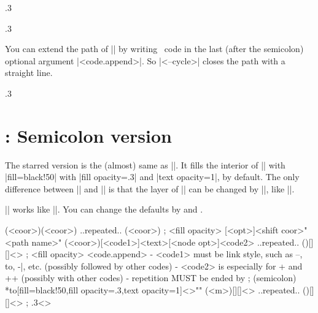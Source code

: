 \begin{tzcode}{.3}
{}
\end{tzcode}

\begin{tzcode}{.3}
{}
\end{tzcode}

You can extend the path of |\tzpath| by writing \Tikz\ code in the last (after the semicolon) optional argument |<code.append>|.
So |<--cycle>| closes the path with a straight line.

\begin{tzcode}{.3}
\end{tzcode}

\section{\protect\cmd{\tzpath*}: Semicolon version}
\label{s:tzpath*}

The starred version \icmd{\tzpath*} is the (almost) same as |\tzlinks*[draw=none]|. It fills the interior of |\tzpath| with |fill=black!50| with |fill opacity=.3| and |text opacity=1|, by default.
The only difference between |\tzpath*| and |\tzlinks*[draw=none]| is that the layer of |\tzpath*| can be changed by |\settzpathlayer|, like ||.

|\tzpath*| works like |\tzpath[fill=black!50,fill opacity=.3,text opacity=1]|.
You can change the defaults by \icmd{\settzfillcolor} and \icmd{\settzfillopacity}.

\begin{tzdef}{}
\tzpath*(<coor>)(<coor>) ..repeated.. (<coor>) ; {<fill opacity>}
[<opt>]<shift coor>"<path name>"
        (<coor>)[<code1>]{<text>}[<node opt>]<code2>
        ..repeated.. ()[]{}[]<> ; {<fill opacity>} <code.append>
  - <code1> must be link style, such as --, to, -|, etc.
           (possibly followed by other codes)
  - <code2> is especially for + and ++
           (possibly with other codes)
  - repetition MUST be ended by ; (semicolon)
 *{to}[fill=black!50,fill opacity=.3,text opacity=1]<>""
  (<m>)[]{}[]<> ..repeated.. ()[]{}[]<> ; {.3}<>
\end{tzdef}



